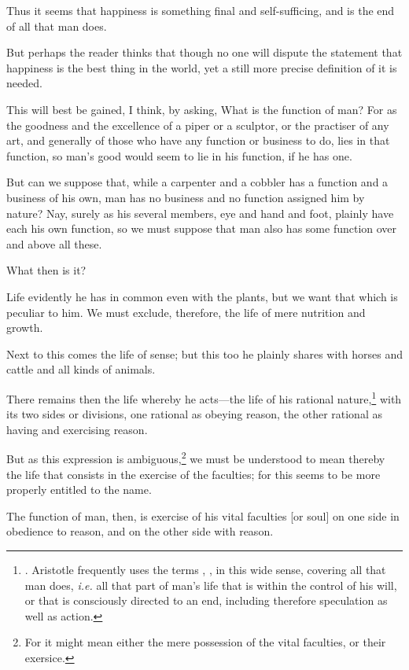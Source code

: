 Thus it seems that happiness is something final and self-sufficing,
and is the end of all that man does.

But perhaps the reader thinks that though no one will dispute the
statement that happiness is the best thing in the world, yet a still
more precise definition of it is needed.

This will best be gained, I think, by asking, What is the function of
man? For as the goodness and the excellence of a piper or a sculptor,
or the practiser of any art, and generally of those who have any
function or business to do, lies in that function, so man's good would
seem to lie in his function, if he has one.

But can we suppose that, while a carpenter and a cobbler has a
function and a business of his own, man has no business and no
function assigned him by nature? Nay, surely as his several members,
eye and hand and foot, plainly have each his own function, so we must
suppose that man also has some function over and above all these.

What then is it?

Life evidently he has in common even with the plants, but we want that
which is peculiar to him. We must exclude, therefore, the life of mere
nutrition and growth.

Next to this comes the life of sense; but this too he plainly shares
with horses and cattle and all kinds of animals.

There remains then the life whereby he acts---the  life of
his rational nature,\footnote{.
Aristotle frequently uses the terms , ,
 in this wide sense, covering all that man does,
\textit{i.e.} all that part of man's life that is within the control
of his will, or that is consciously directed to an end, including
therefore speculation as well as action.} with its two sides or
divisions, one rational as obeying reason, the other rational as
having and exercising reason.

But as this expression is ambiguous,\footnote{For it might mean either
the mere possession of the vital faculties, or their exersice.} we
must be understood to mean thereby the life that consists in the
exercise of the faculties; for this seems to be more properly entitled
to the name.

The function of man, then, is exercise of his vital faculties [or
soul] on one side in obedience to reason, and on the other side with
reason.

